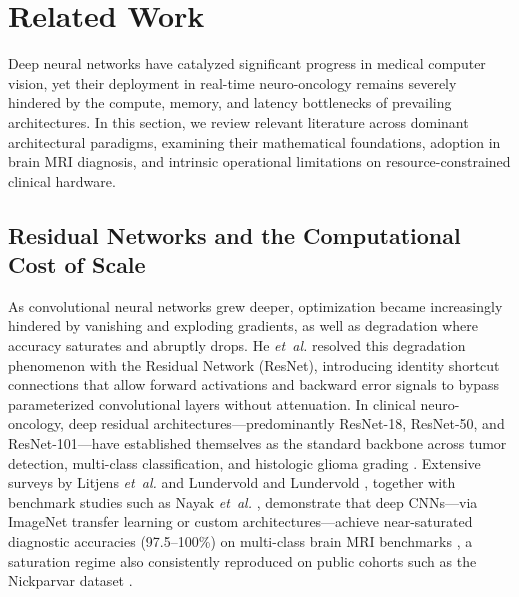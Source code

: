\section{Related Work}
\label{sec:related_work}

Deep neural networks have catalyzed significant progress in medical computer vision, yet their deployment in real-time neuro-oncology remains severely hindered by the compute, memory, and latency bottlenecks of prevailing architectures. In this section, we review relevant literature across dominant architectural paradigms, examining their mathematical foundations, adoption in brain MRI diagnosis, and intrinsic operational limitations on resource-constrained clinical hardware.

\subsection{Residual Networks and the Computational Cost of Scale}
As convolutional neural networks grew deeper, optimization became increasingly hindered by vanishing and exploding gradients, as well as degradation where accuracy saturates and abruptly drops. He \emph{et~al.} \cite{10} resolved this degradation phenomenon with the Residual Network (ResNet), introducing identity shortcut connections that allow forward activations and backward error signals to bypass parameterized convolutional layers without attenuation. In clinical neuro-oncology, deep residual architectures---predominantly ResNet-18, ResNet-50, and ResNet-101---have established themselves as the standard backbone across tumor detection, multi-class classification, and histologic glioma grading \cite{7, 28, 38, 39}. Extensive surveys by Litjens \emph{et~al.} \cite{7} and Lundervold and Lundervold \cite{38}, together with benchmark studies such as Nayak \emph{et~al.} \cite{39}, demonstrate that deep CNNs---via ImageNet transfer learning or custom architectures---achieve near-saturated diagnostic accuracies (97.5--100\%) on multi-class brain MRI benchmarks \cite{39}, a saturation regime also consistently reproduced on public cohorts such as the Nickparvar dataset \cite{26}.

